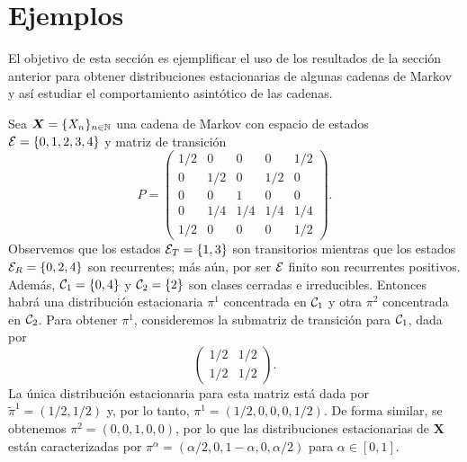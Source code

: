 \section{Ejemplos}

\noindent El objetivo de esta sección es ejemplificar el uso de los resultados de la sección anterior para obtener distribuciones estacionarias de algunas cadenas de Markov y así estudiar el comportamiento asintótico de las cadenas.

\begin{example}
    Sea $\bm X = \{X_n\}_{n \in \mathbb{N}}$ una cadena de Markov con espacio de estados $\mathcal{E} = \{0, 1, 2, 3, 4\}$ y matriz de transición 
    \[
        P = \begin{pmatrix}
            1/2 & 0 & 0 & 0 & 1/2 \\
            0 & 1/2 & 0 & 1/2 & 0 \\
            0 & 0 & 1 & 0 & 0 \\
            0 & 1/4 & 1/4 & 1/4 & 1/4 \\
            1/2 & 0 & 0 & 0  & 1/2
        \end{pmatrix}.
    \]
    Observemos que los estados $\mathcal{E}_T = \{1, 3\}$ son transitorios mientras que los estados $\mathcal{E}_R = \{0, 2, 4\}$ son recurrentes; más aún, por ser $\mathcal{E}$ finito son recurrentes positivos. Además, $\mathcal{C}_1 = \{0,4\}$ y $\mathcal{C}_2 = \{2\}$ son clases cerradas e irreducibles. Entonces habrá una distribución estacionaria $\pi^1$ concentrada en $\mathcal{C}_1$ y otra $\pi^2$ concentrada en $\mathcal{C}_2$. Para obtener $\pi^1$, consideremos la submatriz de transición para $\mathcal{C}_1$, dada por 
    \[
        \begin{pmatrix}
            1/2 & 1/2 \\ 1/2 & 1/2
        \end{pmatrix}.
    \]
    La única distribución estacionaria para esta matriz está dada por $\tilde\pi^1 = (1/2, 1/2)$ y, por lo tanto, $\pi^1 = (1/2, 0, 0, 0, 1/2)$. De forma similar, se obtenemos $\pi^2 = (0,0,1,0,0)$, por lo que las distribuciones estacionarias de $\bm X$ están caracterizadas por $\pi^\alpha = (\alpha/2, 0, 1-\alpha, 0, \alpha/2)$ para $\alpha \in [0,1]$.


\end{example}
